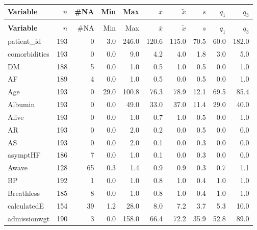 
\begin{footnotesize}
\begin{tabularx}{\textwidth}{P{2.4cm}RRRRRRRRR}
\caption{Patient characteristics: HFpEF variables} \label{tab:desc_stat_HFpEF_variables}\\
\toprule
\textbf{Variable} & $n$ & \#NA & Min & Max & $\bar{x}$ & $\widetilde{x}$ & $s$ & $q_1$ & $q_3$ \\ 
\midrule
\endfirsthead
\caption*{\textbf{Table \ref{tab:desc_stat_HFpEF_variables}:} Patient characteristics: HFpEF variables (\textit{continued})}\\
\toprule
\textbf{Variable} & $n$ & \#NA & Min & Max & $\bar{x}$ & $\widetilde{x}$ & $s$ & $q_1$ & $q_3$ \\ 
\midrule
\endhead
patient\_id & 193 &   0 &   3.0 &   246.0 &  120.6 &  115.0 &   70.5 &  60.0 &  182.0 \\ 
comorbidities & 193 &   0 &   0.0 &     9.0 &    4.2 &    4.0 &    1.8 &   3.0 &    5.0 \\ 
DM & 188 &   5 &   0.0 &     1.0 &    0.5 &    1.0 &    0.5 &   0.0 &    1.0 \\ 
AF & 189 &   4 &   0.0 &     1.0 &    0.5 &    0.0 &    0.5 &   0.0 &    1.0 \\ 
Age & 193 &   0 &  29.0 &   100.8 &   76.3 &   78.9 &   12.1 &  69.5 &   85.4 \\ 
Albumin & 193 &   0 &   0.0 &    49.0 &   33.0 &   37.0 &   11.4 &  29.0 &   40.0 \\ 
Alive & 193 &   0 &   0.0 &     1.0 &    0.7 &    1.0 &    0.5 &   0.0 &    1.0 \\ 
AR & 193 &   0 &   0.0 &     2.0 &    0.2 &    0.0 &    0.5 &   0.0 &    0.0 \\ 
AS & 193 &   0 &   0.0 &     2.0 &    0.1 &    0.0 &    0.3 &   0.0 &    0.0 \\ 
asymptHF & 186 &   7 &   0.0 &     1.0 &    0.1 &    0.0 &    0.3 &   0.0 &    0.0 \\ 
Awave & 128 &  65 &   0.3 &     1.4 &    0.9 &    0.9 &    0.3 &   0.7 &    1.1 \\ 
BP & 192 &   1 &   0.0 &     1.0 &    0.8 &    1.0 &    0.4 &   1.0 &    1.0 \\ 
Breathless & 185 &   8 &   0.0 &     1.0 &    0.8 &    1.0 &    0.4 &   1.0 &    1.0 \\ 
calculatedE & 154 &  39 &   1.2 &    28.0 &    8.0 &    7.2 &    3.7 &   5.3 &   10.0 \\ 
admissionwgt & 190 &   3 &   0.0 &   158.0 &   66.4 &   72.2 &   35.9 &  52.8 &   89.0 \\ 

\end{tabularx}
\end{footnotesize}
